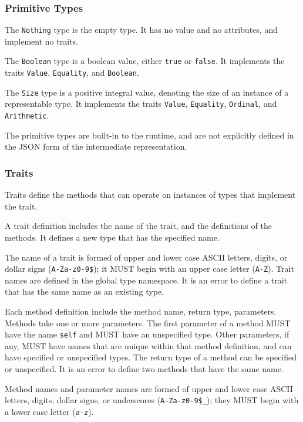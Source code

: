 \documentclass[10pt,twocolumn,a4paper]{article}
\newcommand{\code}[1]{\texttt{#1}}
\begin{document}
\subsubsection{Primitive Types}
\label{sec:primitives}

The \code{Nothing} type is the empty type. It has no value and no attributes,
and implement no traits.

The \code{Boolean} type is a boolean value, either \code{true} or \code{false}.
It implements the traits \code{Value}, \code{Equality}, and \code{Boolean}.

The \code{Size} type is a positive integral value, denoting the size of an
instance of a representable type. It implements the traits \code{Value},
\code{Equality}, \code{Ordinal}, and \code{Arithmetic}.

The primitive types are built-in to the runtime, and are not explicitly
defined in the JSON form of the intermediate representation.

\subsubsection{Traits}
\label{sec:traits}

Traits define the methods that can operate on instances of types that
implement the trait.

A trait definition includes the name of the trait, and the definitions
of the methods. It defines a new type that has the specified name.

The name of a trait is formed of upper and lower case ASCII letters,
digits, or dollar signs (\code{A-Za-z0-9\$}); it MUST begin with an
upper case letter (\code{A-Z}). Trait names are defined in the global type
namespace.  It is an error to define a trait that has the same name as an
existing type.

Each method definition include the method name, return type, parameters.
Methods take one or more parameters.
The first parameter of a method MUST have the name \code{self} and MUST
have an unspecified type.
Other parameters, if any, MUST have names that are unique within that
method definition, and can have specified or unspecified types.
The return type of a method can be specified or unspecified.  
It is an error to define two methods that have the same name.

Method names and parameter names are formed of upper and lower case ASCII
letters, digits, dollar signs, or underscores (\code{A-Za-z0-9\$\_});
they MUST begin with a lower case letter (\code{a-z}).
\end{document}
